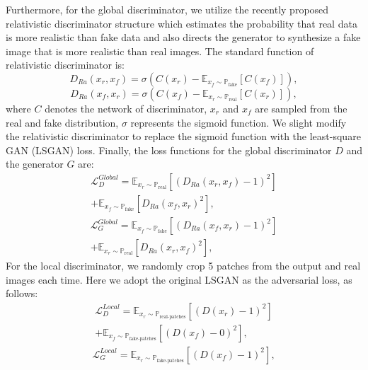 \documentclass[journal]{IEEEtran}
\begin{document}
Furthermore, for the global discriminator, 
we utilize the recently proposed relativistic discriminator structure \cite{jolicoeur2018relativistic} which estimates the probability that real data is more realistic than fake data and also directs the generator to synthesize a fake image that is more realistic than real images. The standard function of relativistic discriminator is:
\begin{equation}
    D_{Ra}(x_r, x_f) = \sigma(C(x_r) - \mathbb{E}_{x_f\sim\mathbb{P}_{\text{fake}}}[C(x_f)]),
\end{equation}
\begin{equation}
    D_{Ra}(x_f, x_r) = \sigma(C(x_f) - \mathbb{E}_{x_r\sim\mathbb{P}_{\text{real}}}[C(x_r)]),
\end{equation}
where $C$ denotes the network of discriminator, $x_r$ and $x_f$ are sampled from the real and fake distribution, $\sigma$ represents the sigmoid function. We slight modify the relativistic discriminator to replace the sigmoid function with the least-square GAN (LSGAN) \cite{mao2017least} loss. 
Finally, the loss functions for the global discriminator $D$ and the generator $G$ are:
\begin{multline}
     \mathcal{L}_D^{Global} = \mathbb{E}_{x_r\sim\mathbb{P}_{\text{real}}}[(D_{Ra}(x_r,x_f) - 1)^2] \\ 
     + \mathbb{E}_{x_f\sim\mathbb{P}_{\text{fake}}}[D_{Ra}(x_f,x_r)^2],
\end{multline}
\begin{multline}
     \mathcal{L}_G^{Global} = \mathbb{E}_{x_f\sim\mathbb{P}_{\text{fake}}}[(D_{Ra}(x_f,x_r) - 1)^2] \\ 
     + \mathbb{E}_{x_r\sim\mathbb{P}_{\text{real}}}[D_{Ra}(x_r,x_f)^2],
\end{multline}
For the local discriminator, we randomly crop 5 patches from the output and real images each time. Here we adopt the original LSGAN as the adversarial loss, as follows:
\begin{multline}
     \mathcal{L}_D^{Local} = \mathbb{E}_{x_r\sim\mathbb{P}_{\text{real-patches}}}[(D(x_r) - 1)^2] \\ 
     + \mathbb{E}_{x_f\sim\mathbb{P}_{\text{fake-patches}}}[(D(x_f) - 0)^2],
\end{multline}
\begin{align}
\mathcal{L}_G^{Local} = \mathbb{E}_{x_r\sim\mathbb{P}_{\text{fake-patches}}}[(D(x_f) - 1)^2],
\end{align}
\end{document}
